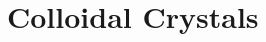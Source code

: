 \documentclass[\main/dresen_thesis.tex]{subfiles}
\begin{document}
  \section{Colloidal Crystals}
\end{document}
